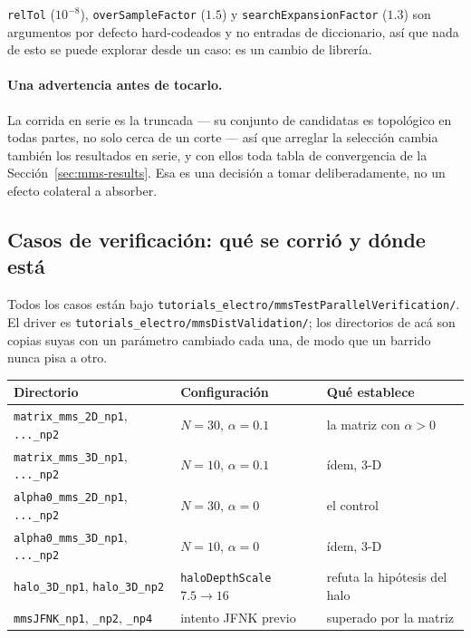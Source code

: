 \documentclass[11pt,a4paper]{article}
\newcommand{\code}[1]{\texttt{\small #1}}
\begin{document}
\code{relTol} ($10^{-8}$), \code{overSampleFactor} ($1.5$) y
\code{searchExpansionFactor} ($1.3$) son argumentos por defecto hard-codeados y
no entradas de diccionario, así que nada de esto se puede explorar desde un
caso: es un cambio de librería.

\paragraph{Una advertencia antes de tocarlo.} La corrida en serie es la truncada
--- su conjunto de candidatas es topológico en todas partes, no solo cerca de un
corte --- así que arreglar la selección cambia también los resultados en serie, y
con ellos toda tabla de convergencia de la Sección~\ref{sec:mms-results}. Esa es
una decisión a tomar deliberadamente, no un efecto colateral a absorber.



\subsection{Casos de verificación: qué se corrió y dónde está}
\label{sec:parverif-casos}

Todos los casos están bajo
\code{tutorials\_electro/mmsTestParallelVerification/}. El driver es
\code{tutorials\_electro/mmsDistValidation/}; los directorios de acá son copias
suyas con un parámetro cambiado cada una, de modo que un barrido nunca pisa a
otro.

\begin{center}
\begin{tabular}{@{}lll@{}}
\toprule
Directorio & Configuración & Qué establece \\
\midrule
\code{matrix\_mms\_2D\_np1}, \code{...\_np2}   & $N=30$, $\alpha=0.1$ & la matriz con $\alpha>0$ \\
\code{matrix\_mms\_3D\_np1}, \code{...\_np2}   & $N=10$, $\alpha=0.1$ & ídem, 3-D \\
\code{alpha0\_mms\_2D\_np1}, \code{...\_np2}   & $N=30$, $\alpha=0$   & el control \\
\code{alpha0\_mms\_3D\_np1}, \code{...\_np2}   & $N=10$, $\alpha=0$   & ídem, 3-D \\
\code{halo\_3D\_np1}, \code{halo\_3D\_np2}     & \code{haloDepthScale} $7.5\to16$ & refuta la hipótesis del halo \\
\code{mmsJFNK\_np1}, \code{\_np2}, \code{\_np4} & intento JFNK previo & superado por la matriz \\
\bottomrule
\end{tabular}
\end{center}
\end{document}

